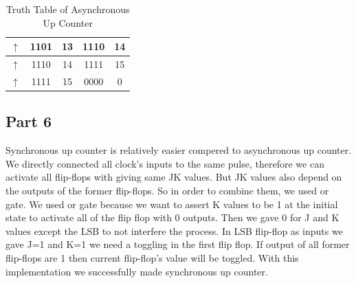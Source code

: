 \documentclass[pdftex,12pt,a4paper]{article}
\begin{document}
\begin{table}[H]
\begin{tabular}{|c|c|c|c|c|}
$\uparrow$                                                                 & 1101                                                      & 13                                                        & 1110                                                   & 14                                                      \\ \hline
$\uparrow$                                                                 & 1110                                                      & 14                                                        & 1111                                                   & 15                                                      \\ \hline
$\uparrow$                                                                 & 1111                                                      & 15                                                        & 0000                                                   & 0                                                       \\ \hline
\end{tabular}
\caption{Truth Table of Asynchronous Up Counter }
\label{tab:my-table}
\end{table}


\subsection{Part 6}
Synchronous up counter is relatively easier compered to asynchronous up counter.
We directly connected all clock's inputs to the same pulse, therefore we can activate all flip-flops with giving same JK values. But JK values also depend on the outputs of the former flip-flops. So in order to combine them, we used or gate. We used or gate because we want to assert K values to be 1 at the initial state to activate all of the flip flop with 0 outputs. Then we gave 0 for J and K values except the LSB to not interfere the process. In LSB flip-flop as inputs we gave J=1 and K=1  we need a toggling in the first flip flop. If output of all former flip-flops are 1 then current flip-flop's value will be toggled. With this implementation we successfully made synchronous up counter. 
\end{document}
